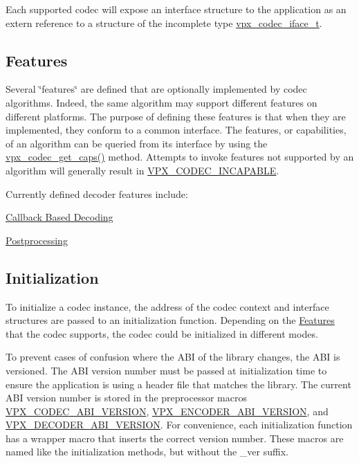 Each supported codec will expose an interface structure to the application as an {\ttfamily extern} reference to a structure of the incomplete type \hyperlink{group__codec_gae99c3b04f4a567a311211cce3ae6b83b}{vpx\+\_\+codec\+\_\+iface\+\_\+t}.\hypertarget{usage_usage_features}{}\subsection{Features}\label{usage_usage_features}
Several \char`\"{}features\char`\"{} are defined that are optionally implemented by codec algorithms. Indeed, the same algorithm may support different features on different platforms. The purpose of defining these features is that when they are implemented, they conform to a common interface. The features, or capabilities, of an algorithm can be queried from it\textquotesingle{}s interface by using the \hyperlink{group__codec_ga43adff58759093401235fb99247c82b8}{vpx\+\_\+codec\+\_\+get\+\_\+caps()} method. Attempts to invoke features not supported by an algorithm will generally result in \hyperlink{group__codec_ggada1084710837ad363b92f2379dd2b8d2a4470784ba5a3ef84dc0697d5489dd292}{V\+P\+X\+\_\+\+C\+O\+D\+E\+C\+\_\+\+I\+N\+C\+A\+P\+A\+B\+LE}.

Currently defined decoder features include\+:
\begin{DoxyItemize}
\item \hyperlink{usage_decode_usage_cb}{Callback Based Decoding}
\item \hyperlink{usage_decode_usage_postproc}{Postprocessing}
\end{DoxyItemize}\hypertarget{usage_usage_init}{}\subsection{Initialization}\label{usage_usage_init}
To initialize a codec instance, the address of the codec context and interface structures are passed to an initialization function. Depending on the \hyperlink{usage_usage_features}{Features} that the codec supports, the codec could be initialized in different modes.

To prevent cases of confusion where the A\+BI of the library changes, the A\+BI is versioned. The A\+BI version number must be passed at initialization time to ensure the application is using a header file that matches the library. The current A\+BI version number is stored in the preprocessor macros \hyperlink{group__codec_gaf7e9cad2df0f81679b881f46740ad097}{V\+P\+X\+\_\+\+C\+O\+D\+E\+C\+\_\+\+A\+B\+I\+\_\+\+V\+E\+R\+S\+I\+ON}, \hyperlink{group__encoder_gaa4f0b52293c08ba672429c3a03648b9d}{V\+P\+X\+\_\+\+E\+N\+C\+O\+D\+E\+R\+\_\+\+A\+B\+I\+\_\+\+V\+E\+R\+S\+I\+ON}, and \hyperlink{group__decoder_ga462b459e7ae13937e1eae1776245db12}{V\+P\+X\+\_\+\+D\+E\+C\+O\+D\+E\+R\+\_\+\+A\+B\+I\+\_\+\+V\+E\+R\+S\+I\+ON}. For convenience, each initialization function has a wrapper macro that inserts the correct version number. These macros are named like the initialization methods, but without the \+\_\+ver suffix.

